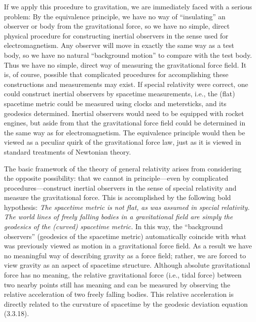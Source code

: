If we apply this procedure to gravitation, we are immediately faced with a serious
problem: By the equivalence principle, we have no way of
\textquotedblleft insulating\textquotedblright{} an observer or body from the
gravitational force, so we have no simple, direct physical procedure for
constructing inertial observers in the sense used for electromagnetism. Any
observer will move in exactly the same way as a test body, so we have no natural
\textquotedblleft background motion\textquotedblright{} to compare with the test
body. Thus we have no simple, direct way of measuring the gravitational force
field. It is, of course, possible that complicated procedures for accomplishing
these constructions and measurements may exist. If special relativity were
correct, one could construct inertial observers by spacetime measurements, i.e.,
the (flat) spacetime metric could be measured using clocks and metersticks, and its
geodesics determined. Inertial observers would need to be equipped with rocket
engines, but aside from that the gravitational force field could be determined in
the same way as for electromagnetism. The equivalence principle would then be
viewed as a peculiar quirk of the gravitational force law, just as it is viewed in
standard treatments of Newtonian theory.

The basic framework of the theory of general relativity arises from considering the
opposite possibility: that we cannot in principle---even by complicated
procedures---construct inertial observers in the sense of special relativity and
measure the gravitational force. This is accomplished by the following bold
hypothesis: \emph{The spacetime metric is not flat, as was assumed in special
relativity. The world lines of freely falling bodies in a gravitational field are
simply the geodesics of the (curved) spacetime metric.} In this way, the
\textquotedblleft background observers\textquotedblright{} (geodesics of the
spacetime metric) automatically coincide with what was previously viewed as
motion in a gravitational force field. As a result we have no meaningful way of
describing gravity as a force field; rather, we are forced to view gravity as an
aspect of spacetime structure. Although absolute gravitational force has no
meaning, the relative gravitational force (i.e., tidal force) between two nearby
points still has meaning and can be measured by observing the relative acceleration
of two freely falling bodies. This relative acceleration is directly related to the
curvature of spacetime by the geodesic deviation equation (3.3.18).

